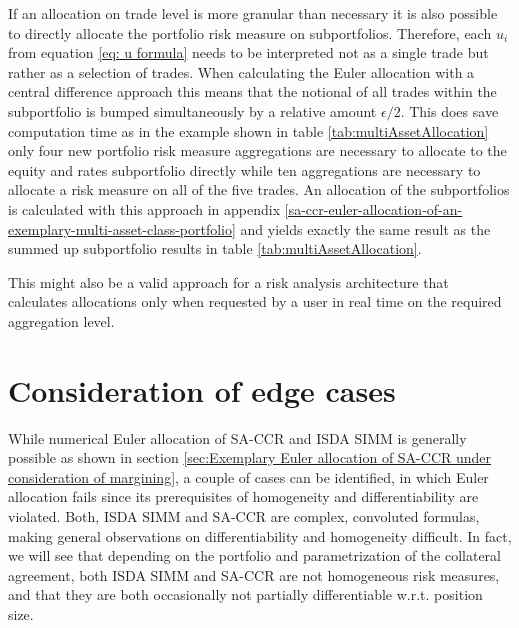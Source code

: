 \documentclass[../Thesis_AHoecherl.tex]{subfiles}
\begin{document}
    If an allocation on trade level is more granular than necessary it is also possible to directly allocate the portfolio risk measure on subportfolios. Therefore, each $u_i$ from equation \ref{eq: u formula} needs to be interpreted not as a single trade but rather as a selection of trades.
    When calculating the Euler allocation with a central difference approach this means that the notional of all trades within the subportfolio is bumped simultaneously by a relative amount $\epsilon / 2$.
    This does save computation time as in the example shown in table \ref{tab:multiAssetAllocation} only four new portfolio risk measure aggregations are necessary to allocate to the equity and rates subportfolio directly while ten aggregations are necessary to allocate a risk measure on all of the five trades. An allocation of the subportfolios is calculated with this approach in appendix \ref{sa-ccr-euler-allocation-of-an-exemplary-multi-asset-class-portfolio} and yields exactly the same result as the summed up subportfolio results in table \ref{tab:multiAssetAllocation}.

    This might also be a valid approach for a risk analysis architecture that calculates allocations only when requested by a user in real time on the required aggregation level. 

    

    \section{Consideration of edge cases\label{sec:Consideration of edge cases}}

    While numerical Euler allocation of \gls{SA-CCR} and \gls{ISDA SIMM} is generally possible as shown in section \ref{sec:Exemplary Euler allocation of SA-CCR under consideration of margining}, a couple of cases can be identified, in which Euler allocation fails since its prerequisites of homogeneity and differentiability are violated.
    Both, \gls{ISDA SIMM} and \gls{SA-CCR} are complex, convoluted formulas, making general observations on differentiability and homogeneity difficult.
    In fact, we will see that depending on the portfolio and parametrization of the collateral agreement, both \gls{ISDA SIMM} and \gls{SA-CCR} are not homogeneous risk measures, and that they are both occasionally not partially differentiable w.r.t. position size.
    
\end{document}
